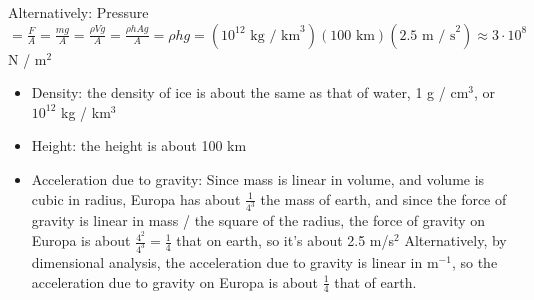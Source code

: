 \documentclass{esg8012pset}
\begin{document}
\begin{solution}
  Alternatively:
  Pressure $ = \frac{F}{A} = \frac{mg}{A} = \frac{\rho Vg}{A} = \frac{\rho h A g}{A} = \rho h g = (10^{12}\text{ kg / km}^3)(100\text{ km})(2.5\text{ m / s}^2) \approx 3\cdot 10^8$ N / m$^2$
  \begin{itemize}
    \item Density: the density of ice is about the same as that of water, 1 g / cm$^3$, or $10^{12}$ kg / km$^3$
    \item Height: the height is about 100 km
    \item Acceleration due to gravity: Since mass is linear in volume, and volume is cubic in radius, Europa has about $\frac{1}{4^3}$ the mass of earth, and since the force of gravity is linear in mass / the square of the radius, the force of gravity on Europa is about $\frac{4^2}{4^3} = \frac{1}{4}$ that on earth, so it's about 2.5 m/s$^2$  Alternatively, by dimensional analysis, the acceleration due to gravity is linear in m$^{-1}$, so the acceleration due to gravity on Europa is about $\frac{1}{4}$ that of earth.
  \end{itemize}
\end{solution}%
\end{document}

